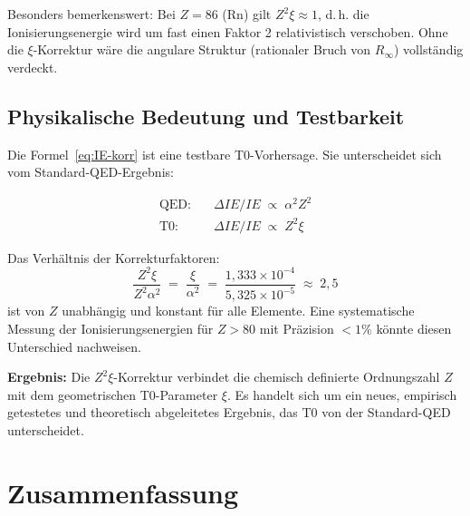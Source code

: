 Besonders bemerkenswert: Bei $Z = 86$ (Rn) gilt $Z^2\xi \approx 1$, d.\,h.
die Ionisierungsenergie wird um fast einen Faktor 2 relativistisch verschoben.
Ohne die $\xi$-Korrektur wäre die angulare Struktur (rationaler Bruch von
$R_\infty$) vollständig verdeckt.

\subsection{Physikalische Bedeutung und Testbarkeit}
\label{subsec:bedeutung}

Die Formel~\eqref{eq:IE-korr} ist eine testbare T0-Vorhersage.
Sie unterscheidet sich vom Standard-QED-Ergebnis:

\begin{align}
  \text{QED:}\quad &\Delta IE/IE \;\propto\; \alpha^2 Z^2 \\
  \text{T0:}\quad  &\Delta IE/IE \;\propto\; Z^2 \xi
\end{align}

Das Verhältnis der Korrekturfaktoren:
\begin{equation}
  \frac{Z^2 \xi}{Z^2 \alpha^2} \;=\; \frac{\xi}{\alpha^2}
  \;=\; \frac{1{,}333 \times 10^{-4}}{5{,}325 \times 10^{-5}}
  \;\approx\; 2{,}5
\end{equation}
ist von $Z$ unabhängig und konstant für alle Elemente. Eine systematische
Messung der Ionisierungsenergien für $Z > 80$ mit Präzision $<1\%$
könnte diesen Unterschied nachweisen.

\textbf{Ergebnis:} Die $Z^2\xi$-Korrektur verbindet die chemisch definierte
Ordnungszahl $Z$ mit dem geometrischen T0-Parameter $\xi$. Es handelt sich
um ein neues, empirisch getestetes und theoretisch abgeleitetes Ergebnis,
das T0 von der Standard-QED unterscheidet.

\section{Zusammenfassung}
\label{sec:169-zusammenfassung}

\begin{table}[htbp]
\centering
\caption{Status der drei Nachfolgeuntersuchungen}
\label{tab:status}
\end{table}

